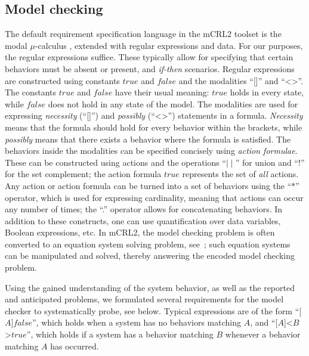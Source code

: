 \documentclass[sort&compress,preprint,3p]{elsarticle}
\begin{document}
\subsection{Model checking}
The default requirement specification language in the mCRL2 toolset is
the modal $\mu$-calculus \cite{ProcessesWithData}, extended with regular
expressions and data.  For our purposes, the regular expressions suffice.
These typically allow for specifying that certain behaviors must be
absent or present, and \emph{if-then} scenarios. Regular expressions
are constructed using constants $true$ and $false$ and the modalities
``[]'' and ``\textless\textgreater''. The constants $true$ and $false$
have their usual meaning: $true$ holds in every state, while $false$ does
not hold in any state of the model. The modalities are used for expressing
\textit{necessity} (``[]'') and \textit{possibly} (``\textless\textgreater'')
statements in a formula. \textit{Necessity} means that the formula should
hold for every behavior within the brackets, while \textit{possibly}
means that there exists a behavior where the formula is satisfied. The
behaviors inside the modalities can be specified concisely using
\emph{action formulae}. These can be constructed using actions and the
operations ``$\mid\mid$'' for union and ``!''
for the set complement; the action formula \begin{math}true\end{math}
represents the set of \emph{all} actions. Any action or action formula
can be turned into a set of behaviors using the ``$\ast$'' operator,
which is used for expressing cardinality, meaning that actions can occur
any number of times; the ``.'' operator allows for concatenating
behaviors. In addition to these constructs, one can use
quantification over data variables, Boolean expressions,
etc. In mCRL2, the model checking problem is often converted to
an equation system solving problem, see~\cite{ProcessesWithData}; such equation systems
can be manipulated and solved, thereby answering the encoded
model checking problem.



Using the gained understanding of the system behavior, as well as the
reported and anticipated problems, we formulated several requirements for
the model checker to systematically probe, see below. Typical expressions
are of the form ``[$A$]$false$'', which holds when a system has no
behaviors matching $A$, and ``[$A$]\textless$B$\textgreater$true$'',
which holds if a system has a behavior matching $B$ whenever a behavior
matching $A$ has occurred.
\end{document}
